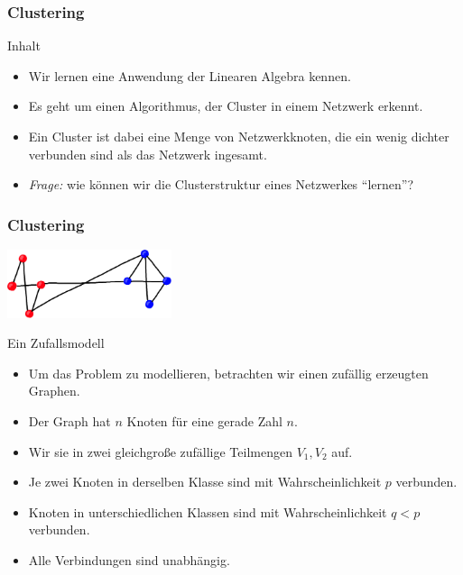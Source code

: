 \documentclass{beamer}
\title[Linadi]{\mytitle}
\author[Amin Coja-Oghlan]{Amin Coja-Oghlan}
\institute[Frankfurt]{JWGUFFM}
\date{}
\renewcommand{\emph}[1]{{\textcolor{solarizedRed}{\itshape #1}}}
\renewcommand{\ae}{\"a}
\renewcommand{\oe}{\"o}
\newcommand{\ue}{\"u}
\newcommand{\mytitle}{Clustering}
\begin{document}
\frame[plain]{\titlepage}

\begin{frame}\frametitle{\mytitle}
	\begin{block}{Inhalt}
		\begin{itemize}
			\item Wir lernen eine Anwendung der Linearen Algebra kennen.
			\item Es geht um einen Algorithmus, der Cluster in einem Netzwerk erkennt.
			\item Ein Cluster ist dabei eine Menge von Netzwerkknoten, die ein wenig dichter verbunden sind als das Netzwerk ingesamt.
			\item \emph{Frage:} wie k\oe nnen wir die Clusterstruktur eines Netzwerkes ``lernen''?
		\end{itemize}
	\end{block}
\end{frame}

\begin{frame}\frametitle{\mytitle}
	\hfill\includegraphics[height=20mm]{pics/sbm.pdf}
	\begin{block}{Ein Zufallsmodell}
		\begin{itemize}
			\item Um das Problem zu modellieren, betrachten wir einen zuf\ae llig erzeugten Graphen.
			\item Der Graph hat $n$ Knoten f\ue r eine gerade Zahl $n$.
			\item Wir sie in zwei gleichgro\ss e zuf\ae llige Teilmengen $V_1,V_2$ auf.
			\item Je zwei Knoten in derselben Klasse sind mit Wahrscheinlichkeit $p$ verbunden.
			\item Knoten in unterschiedlichen Klassen sind mit Wahrscheinlichkeit $q<p$ verbunden.
			\item Alle Verbindungen sind unabh\ae ngig.
		\end{itemize}
	\end{block}
\end{frame}
\end{document}
